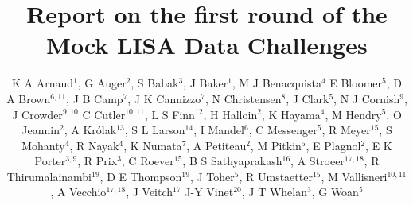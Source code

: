 \documentclass[12pt]{iopart}
\begin{document}
\title[MLDC first round report]{Report on the first round of the Mock LISA Data Challenges}

\author{K A Arnaud$^1$,
G Auger$^2$,
S Babak$^3$,
J Baker$^1$,
M J Benacquista$^4$
E Bloomer$^5$,
D A Brown$^{6,11}$,
J B Camp$^7$,
J K Cannizzo$^7$,
N Christensen$^8$,
J Clark$^5$,
N J Cornish$^9$,
J Crowder$^{9,10}$
C Cutler$^{10,11}$,
L S Finn$^{12}$,
H Halloin$^2$,
K Hayama$^4$,
M Hendry$^5$,
O Jeannin$^2$,
A Kr\'olak$^{13}$,
S L Larson$^{14}$,
I Mandel$^6$,
C Messenger$^5$,
R Meyer$^{15}$,
S Mohanty$^4$,
R Nayak$^4$,
K Numata$^7$,
A Petiteau$^2$,
M Pitkin$^5$,
E Plagnol$^2$,
E K Porter$^{3,9}$,
R Prix$^3$,
C Roever$^{15}$,
B S Sathyaprakash$^{16}$,
A Stroeer$^{17,18}$,
R Thirumalainambi$^{19}$,
D E Thompson$^{19}$,
J Toher$^5$,
R Umstaetter$^{15}$,
M Vallisneri$^{10,11}$,
A Vecchio$^{17,18}$,
J Veitch$^{17}$
J-Y Vinet$^{20}$,
J T Whelan$^3$,
G Woan$^5$}
\end{document}
